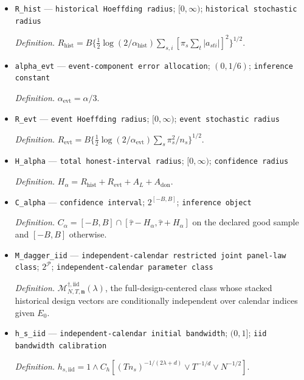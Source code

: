 \documentclass{article}
\begin{document}
\begin{itemize}
  \par\smallskip\noindent\emph{Definition.} \(\alpha_{\mathrm{hist}}=\alpha/3\).
  \item \texttt{R\_\allowbreak{}hist} --- \texttt{historical Hoeffding radius}; \([0,\infty)\); \texttt{historical stochastic radius}
  \par\smallskip\noindent\emph{Definition.} \(R_{\mathrm{hist}}=B\{\tfrac12\log(2/\alpha_{\mathrm{hist}})\sum_{s,i}[\pi_s\sum_t|a_{sti}|]^2\}^{1/2}\).
  \item \texttt{alpha\_\allowbreak{}evt} --- \texttt{event-\allowbreak{}component error allocation}; \((0,1/6)\); \texttt{inference constant}
  \par\smallskip\noindent\emph{Definition.} \(\alpha_{\mathrm{evt}}=\alpha/3\).
  \item \texttt{R\_\allowbreak{}evt} --- \texttt{event Hoeffding radius}; \([0,\infty)\); \texttt{event stochastic radius}
  \par\smallskip\noindent\emph{Definition.} \(R_{\mathrm{evt}}=B\{\tfrac12\log(2/\alpha_{\mathrm{evt}})\sum_s\pi_s^2/n_s\}^{1/2}\).
  \item \texttt{H\_\allowbreak{}alpha} --- \texttt{total honest-\allowbreak{}interval radius}; \([0,\infty)\); \texttt{confidence radius}
  \par\smallskip\noindent\emph{Definition.} \(H_\alpha=R_{\mathrm{hist}}+R_{\mathrm{evt}}+A_L+A_{\mathrm{don}}\).
  \item \texttt{C\_\allowbreak{}alpha} --- \texttt{confidence interval}; \(2^{[-B,B]}\); \texttt{inference object}
  \par\smallskip\noindent\emph{Definition.} \(C_\alpha=[-B,B]\cap[\widehat\tau-H_\alpha,\widehat\tau+H_\alpha]\) on the declared good sample and \([-B,B]\) otherwise.
  \item \texttt{M\_\allowbreak{}dagger\_\allowbreak{}iid} --- \texttt{independent-\allowbreak{}calendar restricted joint panel-\allowbreak{}law class}; \(2^{\mathcal P}\); \texttt{independent-\allowbreak{}calendar parameter class}
  \par\smallskip\noindent\emph{Definition.} \(\mathcal M_{N,T,\mathbf n}^{\dagger,\mathrm{iid}}(\lambda)\), the full-design-centered class whose stacked historical design vectors are conditionally independent over calendar indices given \(E_0\).
  \item \texttt{h\_\allowbreak{}s\_\allowbreak{}iid} --- \texttt{independent-\allowbreak{}calendar initial bandwidth}; \((0,1]\); \texttt{iid bandwidth calibration}
  \par\smallskip\noindent\emph{Definition.} \(h_{s,\mathrm{iid}}=1\wedge C_h[(Tn_s)^{-1/(2\lambda+d)}\vee T^{-1/d}\vee N^{-1/2}]\).

\end{itemize}
\end{document}
